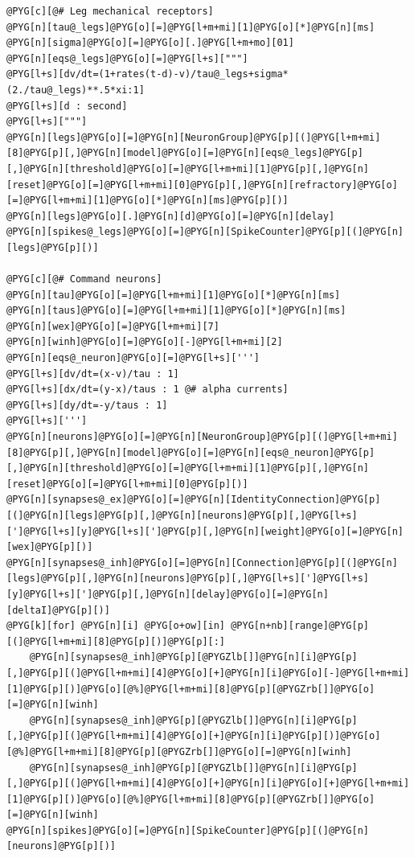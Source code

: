 \documentclass[letterpaper,10pt,english]{manual}
\begin{document}
\begin{Verbatim}[commandchars=@\[\]]
@PYG[c][@# Leg mechanical receptors]
@PYG[n][tau@_legs]@PYG[o][=]@PYG[l+m+mi][1]@PYG[o][*]@PYG[n][ms]
@PYG[n][sigma]@PYG[o][=]@PYG[o][.]@PYG[l+m+mo][01]
@PYG[n][eqs@_legs]@PYG[o][=]@PYG[l+s]["""]
@PYG[l+s][dv/dt=(1+rates(t-d)-v)/tau@_legs+sigma*(2./tau@_legs)**.5*xi:1]
@PYG[l+s][d : second]
@PYG[l+s]["""]
@PYG[n][legs]@PYG[o][=]@PYG[n][NeuronGroup]@PYG[p][(]@PYG[l+m+mi][8]@PYG[p][,]@PYG[n][model]@PYG[o][=]@PYG[n][eqs@_legs]@PYG[p][,]@PYG[n][threshold]@PYG[o][=]@PYG[l+m+mi][1]@PYG[p][,]@PYG[n][reset]@PYG[o][=]@PYG[l+m+mi][0]@PYG[p][,]@PYG[n][refractory]@PYG[o][=]@PYG[l+m+mi][1]@PYG[o][*]@PYG[n][ms]@PYG[p][)]
@PYG[n][legs]@PYG[o][.]@PYG[n][d]@PYG[o][=]@PYG[n][delay]
@PYG[n][spikes@_legs]@PYG[o][=]@PYG[n][SpikeCounter]@PYG[p][(]@PYG[n][legs]@PYG[p][)]

@PYG[c][@# Command neurons]
@PYG[n][tau]@PYG[o][=]@PYG[l+m+mi][1]@PYG[o][*]@PYG[n][ms]
@PYG[n][taus]@PYG[o][=]@PYG[l+m+mi][1]@PYG[o][*]@PYG[n][ms]
@PYG[n][wex]@PYG[o][=]@PYG[l+m+mi][7]
@PYG[n][winh]@PYG[o][=]@PYG[o][-]@PYG[l+m+mi][2]
@PYG[n][eqs@_neuron]@PYG[o][=]@PYG[l+s][''']
@PYG[l+s][dv/dt=(x-v)/tau : 1]
@PYG[l+s][dx/dt=(y-x)/taus : 1 @# alpha currents]
@PYG[l+s][dy/dt=-y/taus : 1]
@PYG[l+s][''']
@PYG[n][neurons]@PYG[o][=]@PYG[n][NeuronGroup]@PYG[p][(]@PYG[l+m+mi][8]@PYG[p][,]@PYG[n][model]@PYG[o][=]@PYG[n][eqs@_neuron]@PYG[p][,]@PYG[n][threshold]@PYG[o][=]@PYG[l+m+mi][1]@PYG[p][,]@PYG[n][reset]@PYG[o][=]@PYG[l+m+mi][0]@PYG[p][)]
@PYG[n][synapses@_ex]@PYG[o][=]@PYG[n][IdentityConnection]@PYG[p][(]@PYG[n][legs]@PYG[p][,]@PYG[n][neurons]@PYG[p][,]@PYG[l+s][']@PYG[l+s][y]@PYG[l+s][']@PYG[p][,]@PYG[n][weight]@PYG[o][=]@PYG[n][wex]@PYG[p][)]
@PYG[n][synapses@_inh]@PYG[o][=]@PYG[n][Connection]@PYG[p][(]@PYG[n][legs]@PYG[p][,]@PYG[n][neurons]@PYG[p][,]@PYG[l+s][']@PYG[l+s][y]@PYG[l+s][']@PYG[p][,]@PYG[n][delay]@PYG[o][=]@PYG[n][deltaI]@PYG[p][)]
@PYG[k][for] @PYG[n][i] @PYG[o+ow][in] @PYG[n+nb][range]@PYG[p][(]@PYG[l+m+mi][8]@PYG[p][)]@PYG[p][:]
    @PYG[n][synapses@_inh]@PYG[p][@PYGZlb[]]@PYG[n][i]@PYG[p][,]@PYG[p][(]@PYG[l+m+mi][4]@PYG[o][+]@PYG[n][i]@PYG[o][-]@PYG[l+m+mi][1]@PYG[p][)]@PYG[o][@%]@PYG[l+m+mi][8]@PYG[p][@PYGZrb[]]@PYG[o][=]@PYG[n][winh]
    @PYG[n][synapses@_inh]@PYG[p][@PYGZlb[]]@PYG[n][i]@PYG[p][,]@PYG[p][(]@PYG[l+m+mi][4]@PYG[o][+]@PYG[n][i]@PYG[p][)]@PYG[o][@%]@PYG[l+m+mi][8]@PYG[p][@PYGZrb[]]@PYG[o][=]@PYG[n][winh]
    @PYG[n][synapses@_inh]@PYG[p][@PYGZlb[]]@PYG[n][i]@PYG[p][,]@PYG[p][(]@PYG[l+m+mi][4]@PYG[o][+]@PYG[n][i]@PYG[o][+]@PYG[l+m+mi][1]@PYG[p][)]@PYG[o][@%]@PYG[l+m+mi][8]@PYG[p][@PYGZrb[]]@PYG[o][=]@PYG[n][winh]
@PYG[n][spikes]@PYG[o][=]@PYG[n][SpikeCounter]@PYG[p][(]@PYG[n][neurons]@PYG[p][)]


\end{Verbatim}
\end{document}
